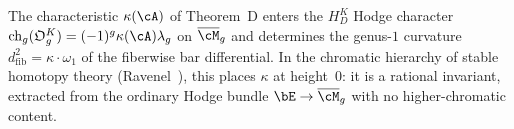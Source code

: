 \begin{remark}
\label{rem:kappa-hodge-to-witten-genus}
\ClaimStatusConjectured
{}
The characteristic $\kappa(\cA)$ of Theorem~D enters the
$H_D^K$ Hodge character
$\operatorname{ch}_g(\mathfrak O_g^K)=
(-1)^g\kappa(\cA)\lambda_g$ on $\overline{\cM}_g$ and determines the
genus-$1$ curvature $d_{\mathrm{fib}}^2 = \kappa \cdot \omega_1$
of the fiberwise bar differential. In the chromatic hierarchy of
stable homotopy theory
(Ravenel~\cite{Ravenel86}), this places $\kappa$ at height~$0$:
it is a rational invariant, extracted from the ordinary Hodge bundle
$\bE \to \overline{\cM}_g$ with no higher-chromatic content.


\end{remark}
